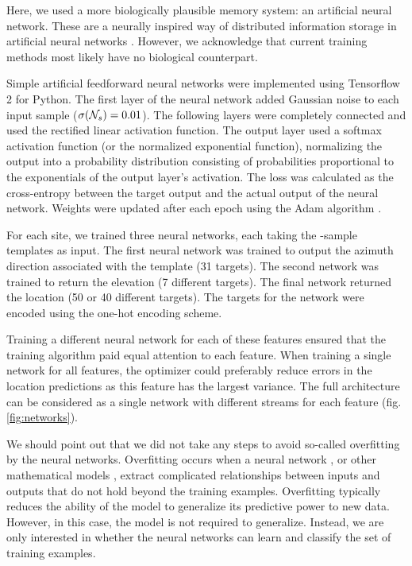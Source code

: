 \documentclass[preprint,5p]{elsarticle}
\begin{document}
Here, we used a more biologically plausible memory system: an artificial neural network. These are a neurally inspired way of distributed information storage in artificial neural networks \citep{Mcleod1998}. However, we acknowledge that current training methods most likely have no biological counterpart.

Simple artificial feedforward neural networks were implemented using Tensorflow 2 for Python. The first layer of the neural network added Gaussian noise to each input sample ($\sigma(\mathcal{N}_s) = 0.01$). The following layers were completely connected and used the rectified linear activation function. The output layer used a softmax activation function (or the normalized exponential function), normalizing the output into a probability distribution consisting of probabilities proportional to the exponentials of the output layer's activation. The loss was calculated as the cross-entropy between the target output and the actual output of the neural network. Weights were updated after each epoch using the Adam algorithm \citep{Kingma2014} .

For each site, we trained three neural networks, each taking the \pca-sample templates as input. The first neural network was trained to output the azimuth direction associated with the template (31 targets). The second network was trained to return the elevation (7 different targets). The final network returned the location (50 or 40 different targets). The targets for the network were encoded using the one-hot encoding scheme. 

Training a different neural network for each of these features ensured that the training algorithm paid equal attention to each feature. When training a single network for all features, the optimizer could preferably reduce errors in the location predictions as this feature has the largest variance. The full architecture can be considered as a single network with different streams for each feature (fig. \ref{fig:networks}).

We should point out that we did not take any steps to avoid so-called overfitting by the neural networks. Overfitting occurs when a neural network \citep{Ghotra2017}, or other mathematical models \citep{Hawkins2004}, extract complicated relationships between inputs and outputs that do not hold beyond the training examples. Overfitting typically reduces the ability of the model to generalize its predictive power to new data. However, in this case, the model is not required to generalize. Instead, we are only interested in whether the neural networks can learn and classify the set of training examples.
\end{document}
